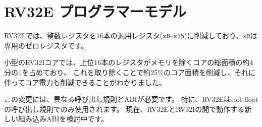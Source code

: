 \begin{comment}
\section{RV32E Programmers' Model}
\end{comment}
\section{RV32E プログラマーモデル}

\begin{comment}
RV32E reduces the integer register count to 16 general-purpose
registers, ({\tt x0}--{\tt x15}), where {\tt x0} is a dedicated zero
register.
\end{comment}

RV32Eでは、整数レジスタを16本の汎用レジスタ({\tt x0}--{\tt x15})に削減しており、{\tt x0}は専用のゼロレジスタです。

\begin{commentary}
\begin{comment}
We have found that in the small RV32I core designs, the upper 16
registers consume around one quarter of the total area of the core
excluding memories, thus their removal saves around 25\% core area
with a corresponding core power reduction.
\end{comment}

小型のRV32Iコアでは、上位16本のレジスタがメモリを除くコアの総面積の約4分の1を占めており、
これを取り除くことで約25\%のコア面積を削減し、それに伴ってコア電力も削減できることがわかりました。
\end{commentary}

\begin{commentary}
\begin{comment}
This change requires a different calling convention and ABI.  In
particular, RV32E is only used with a soft-float calling convention.
A new embedded ABI is under consideration that would work across RV32E
and RV32I.
\end{comment}
この変更には、異なる呼び出し規則とABIが必要です。
特に、RV32Eはsoft-floatの呼び出し規則でのみ使用されます。
現在、RV32EとRV32Iの間で動作する新しい組み込みABIを検討中です。
\end{commentary}

\begin{comment}
\section{RV32E Instruction Set}
\end{comment}
